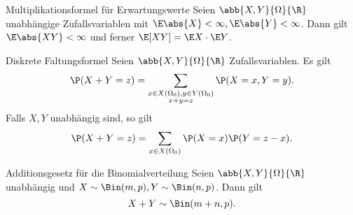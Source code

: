 \begin{karte}{Multiplikationsformel für Erwartungswerte}
    Seien \( \abb{X,Y}{\Omega}{\R} \) unabhängige Zufallsvariablen 
    mit \( \E\abs{X} < \infty, \E\abs{Y} < \infty \). 
    Dann gilt \( \E\abs{XY} < \infty \) und ferner 
    \( \E[XY] = \E X \cdot \E Y \).
\end{karte}

\begin{karte}{Diskrete Faltungsformel}
    Seien \( \abb{X,Y}{\Omega}{\R} \) Zufallsvariablen. 
    Es gilt 
    \[ \P(X + Y = z) = \sum_{\substack{ x \in X(\Omega_0), y \in Y(\Omega_0)\\ x + y = z }} \P(X = x, Y = y). \]
    Falls \( X,Y \) unabhängig sind, so gilt 
    \[ \P(X + Y = z) = \sum_{x \in X(\Omega_0)} \P(X = x) \P(Y = z - x). \]
\end{karte}

\begin{karte}{Additionsgesetz für die Binomialverteilung}
    Seien \( \abb{X,Y}{\Omega}{\R} \) unabhängig und 
    \( X \sim \Bin(m,p), Y \sim \Bin(n,p) \). Dann gilt 
    \[ X + Y \sim \Bin(m+n,p). \]
\end{karte}
